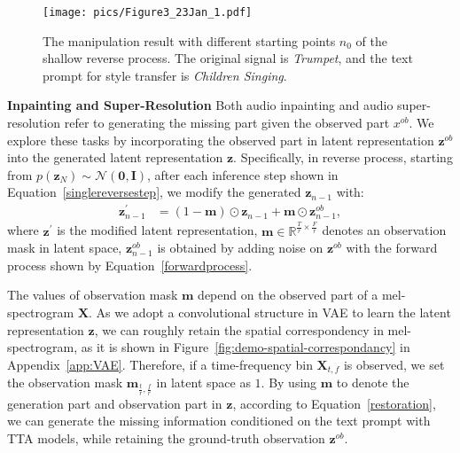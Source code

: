 \documentclass{article}
\begin{document}
\begin{figure}[tbp]
    \centering
    \texttt{[image: pics/Figure3\_23Jan\_1.pdf]}
    \caption{The manipulation result with different starting points $n_0$ of the shallow reverse process. The original signal is \textit{Trumpet}, and the text prompt for style transfer is \textit{Children Singing}.}
    \label{fig:style-transfer-demo}
\end{figure}

\textbf{Inpainting and Super-Resolution}
\label{AI}
Both audio inpainting and audio super-resolution refer to generating the missing part given the observed part $x^{ob}$. We explore these tasks by incorporating the observed part in latent representation $\boldsymbol{z}^{ob}$ into the generated latent representation $\boldsymbol{z}$. Specifically, in reverse process, starting from $p(\boldsymbol{z}_{N})\sim\mathcal N(\boldsymbol{0},\boldsymbol{I})$, after each inference step shown in Equation~\ref{singlereversestep}, we modify the generated $\boldsymbol{z}_{n-1}$ with:
\begin{align}
\label{restoration}
\boldsymbol{z}^{\prime}_{n-1}&=(1-\boldsymbol{m})\odot\boldsymbol{z}_{n-1}+\boldsymbol{m}\odot\boldsymbol{z}^{ob}_{n-1},
\end{align}
where $\boldsymbol{z}^{\prime}$ is the modified latent representation, $\boldsymbol{m}\in \mathbb{R}^{\frac{T}{r}\times \frac{F}{r}}$ denotes an observation mask in latent space, $\boldsymbol{z}^{ob}_{n-1}$ is obtained by adding noise on $\boldsymbol{z}^{ob}$ with the forward process shown by Equation~\ref{forwardprocess}. 

The values of observation mask $\boldsymbol{m}$ depend on the observed part of a mel-spectrogram $\boldsymbol{X}$. As we adopt a convolutional structure in VAE to learn the latent representation $\boldsymbol{z}$, we can roughly retain the spatial correspondency in mel-spectrogram, as it is shown in Figure~\ref{fig:demo-spatial-correspondancy} in Appendix~\ref{app:VAE}. Therefore, if a time-frequency bin $\boldsymbol{X}_{t,f}$ is observed, we set the observation mask $\boldsymbol{m}_{\frac{t}{r},\frac{f}{r}}$ in latent space as $1$.
By using $\boldsymbol{m}$ to denote the generation part and observation part in $\boldsymbol{z}$, according to Equation~\ref{restoration}, we can generate the missing information conditioned on the text prompt with TTA models, while retaining the ground-truth observation $\boldsymbol{z}^{ob}$.
\end{document}
